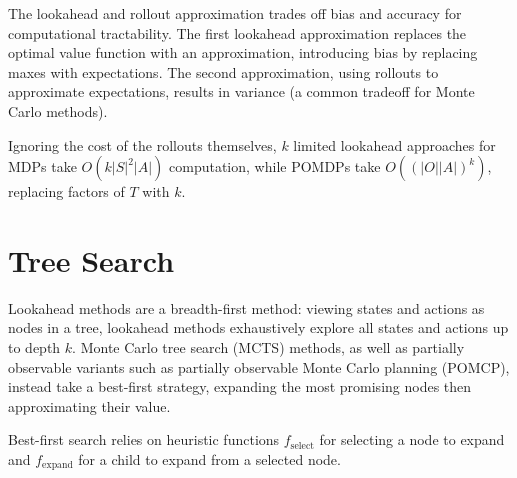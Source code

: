 \documentclass[11pt]{article}
\begin{document}
The lookahead and rollout approximation trades off bias and accuracy for computational
tractability.
The first lookahead approximation replaces the optimal value function with an approximation,
introducing bias by replacing maxes with expectations.
The second approximation, using rollouts to approximate expectations,
results in variance (a common tradeoff for Monte Carlo methods).

Ignoring the cost of the rollouts themselves, $k$ limited lookahead approaches for MDPs
take $O(k|S|^2|A|)$ computation, while POMDPs take $O((|O||A|)^k)$,
replacing factors of $T$ with $k$.

\section{Tree Search}
Lookahead methods are a breadth-first method: viewing states and actions as nodes in a tree,
lookahead methods exhaustively explore all states and actions up to depth $k$.
Monte Carlo tree search (MCTS) methods, as well as
partially observable variants such as partially observable Monte Carlo planning (POMCP),
instead take a best-first strategy, expanding the most promising nodes
then approximating their value.

Best-first search relies on heuristic functions $f_{\text{select}}$ for selecting a node to expand
and $f_{\text{expand}}$ for a child to expand from a selected node.





\appendix
\end{document}
